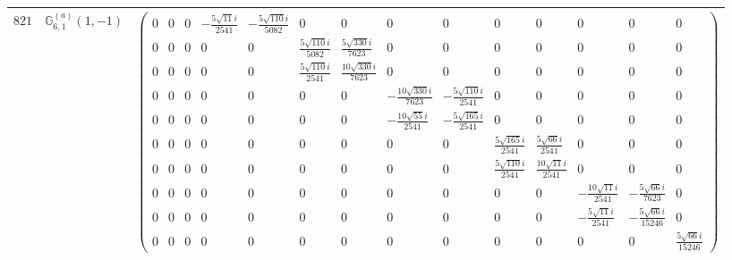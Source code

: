 \documentclass[fleqn,8pt,landscape]{jsarticle}
\begin{document}
\begin{center}
\begin{longtable}{ccc}
$ 821 $ & $ \mathbb{G}_{6,1}^{(a)}(1,-1) $ & $ \begin{pmatrix} 0 & 0 & 0 & - \frac{5 \sqrt{11} i}{2541} & - \frac{5 \sqrt{110} i}{5082} & 0 & 0 & 0 & 0 & 0 & 0 & 0 & 0 & 0 \\ 0 & 0 & 0 & 0 & 0 & \frac{5 \sqrt{110} i}{5082} & \frac{5 \sqrt{330} i}{7623} & 0 & 0 & 0 & 0 & 0 & 0 & 0 \\ 0 & 0 & 0 & 0 & 0 & \frac{5 \sqrt{110} i}{2541} & \frac{10 \sqrt{330} i}{7623} & 0 & 0 & 0 & 0 & 0 & 0 & 0 \\ 0 & 0 & 0 & 0 & 0 & 0 & 0 & - \frac{10 \sqrt{330} i}{7623} & - \frac{5 \sqrt{110} i}{2541} & 0 & 0 & 0 & 0 & 0 \\ 0 & 0 & 0 & 0 & 0 & 0 & 0 & - \frac{10 \sqrt{55} i}{2541} & - \frac{5 \sqrt{165} i}{2541} & 0 & 0 & 0 & 0 & 0 \\ 0 & 0 & 0 & 0 & 0 & 0 & 0 & 0 & 0 & \frac{5 \sqrt{165} i}{2541} & \frac{5 \sqrt{66} i}{2541} & 0 & 0 & 0 \\ 0 & 0 & 0 & 0 & 0 & 0 & 0 & 0 & 0 & \frac{5 \sqrt{110} i}{2541} & \frac{10 \sqrt{11} i}{2541} & 0 & 0 & 0 \\ 0 & 0 & 0 & 0 & 0 & 0 & 0 & 0 & 0 & 0 & 0 & - \frac{10 \sqrt{11} i}{2541} & - \frac{5 \sqrt{66} i}{7623} & 0 \\ 0 & 0 & 0 & 0 & 0 & 0 & 0 & 0 & 0 & 0 & 0 & - \frac{5 \sqrt{11} i}{2541} & - \frac{5 \sqrt{66} i}{15246} & 0 \\ 0 & 0 & 0 & 0 & 0 & 0 & 0 & 0 & 0 & 0 & 0 & 0 & 0 & \frac{5 \sqrt{66} i}{15246} \end{pmatrix} $ \\ \hline

\end{longtable}
\end{center}
\end{document}
